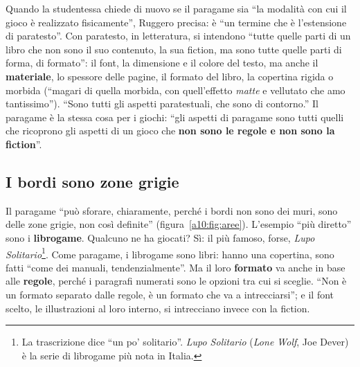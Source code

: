 Quando la studentessa chiede di nuovo se il paragame sia ``la modalità con cui il gioco
è realizzato fisicamente'', Ruggero precisa: è ``un termine che è l'estensione di
paratesto''. Con paratesto, in letteratura, si intendono ``tutte quelle parti di un
libro che non sono il suo contenuto, la sua fiction, ma sono tutte quelle parti di
forma, di formato'': il font, la dimensione e il colore del testo, ma anche il
\textbf{materiale}, lo spessore delle pagine, il formato del libro, la copertina rigida
o morbida (``magari di quella morbida, con quell'effetto \emph{matte} e vellutato che
amo tantissimo''). ``Sono tutti gli aspetti paratestuali, che sono di contorno.''
Il paragame è la stessa cosa per i giochi: ``gli aspetti di paragame sono tutti quelli
che ricoprono gli aspetti di un gioco che \textbf{non sono le regole e non sono la
fiction}''.

\subsection{I bordi sono zone grigie}

Il paragame ``può sforare, chiaramente, perché i bordi non sono dei muri, sono delle
zone grigie, non così definite'' (figura~\ref{a10:fig:aree}). L'esempio ``più diretto''
sono i \textbf{librogame}. Qualcuno ne ha giocati? Sì: il più famoso, forse, \emph{Lupo
Solitario}\footnote{La trascrizione dice ``un po' solitario''. \emph{Lupo Solitario}
(\emph{Lone Wolf}, Joe Dever) è la serie di librogame più nota in Italia.}. Come
paragame, i librogame sono libri: hanno una copertina, sono fatti ``come dei manuali,
tendenzialmente''. Ma il loro \textbf{formato} va anche in base alle \textbf{regole},
perché i paragrafi numerati sono le opzioni tra cui si sceglie. ``Non è un formato
separato dalle regole, è un formato che va a intrecciarsi''; e il font scelto, le
illustrazioni al loro interno, si intrecciano invece con la fiction.

